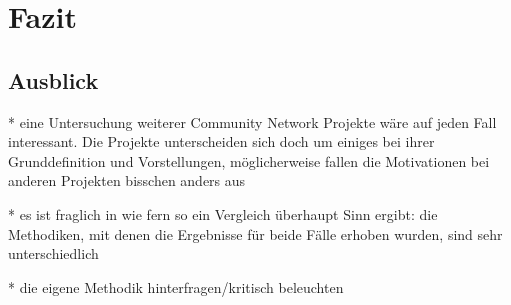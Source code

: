 \section{Fazit}

\subsection{Ausblick}

* eine Untersuchung weiterer Community Network Projekte wäre auf jeden Fall interessant.
  Die Projekte unterscheiden sich doch um einiges bei ihrer Grunddefinition und Vorstellungen, möglicherweise fallen die Motivationen bei anderen Projekten bisschen anders aus

* es ist fraglich in wie fern so ein Vergleich überhaupt Sinn ergibt: die Methodiken, mit denen die Ergebnisse für beide Fälle erhoben wurden, sind sehr unterschiedlich

* die eigene Methodik hinterfragen/kritisch beleuchten
